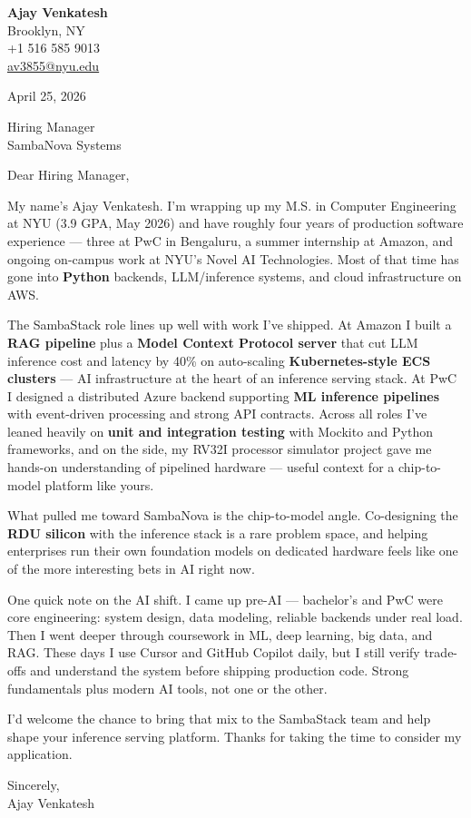 \documentclass[letterpaper,11pt]{article}
\begin{document}
\begin{flushleft}
\textbf{\large Ajay Venkatesh} \\
Brooklyn, NY \\
+1 516 585 9013 \\
\href{mailto:av3855@nyu.edu}{av3855@nyu.edu}
\end{flushleft}

\vspace{10pt}

April 25, 2026

\vspace{6pt}

Hiring Manager \\
SambaNova Systems

\vspace{10pt}

Dear Hiring Manager,

My name's Ajay Venkatesh. I'm wrapping up my M.S. in Computer Engineering at NYU (3.9 GPA, May 2026) and have roughly four years of production software experience --- three at PwC in Bengaluru, a summer internship at Amazon, and ongoing on-campus work at NYU's Novel AI Technologies. Most of that time has gone into \textbf{Python} backends, LLM/inference systems, and cloud infrastructure on AWS.

The SambaStack role lines up well with work I've shipped. At Amazon I built a \textbf{RAG pipeline} plus a \textbf{Model Context Protocol server} that cut LLM inference cost and latency by 40\% on auto-scaling \textbf{Kubernetes-style ECS clusters} --- AI infrastructure at the heart of an inference serving stack. At PwC I designed a distributed Azure backend supporting \textbf{ML inference pipelines} with event-driven processing and strong API contracts. Across all roles I've leaned heavily on \textbf{unit and integration testing} with Mockito and Python frameworks, and on the side, my RV32I processor simulator project gave me hands-on understanding of pipelined hardware --- useful context for a chip-to-model platform like yours.

What pulled me toward SambaNova is the chip-to-model angle. Co-designing the \textbf{RDU silicon} with the inference stack is a rare problem space, and helping enterprises run their own foundation models on dedicated hardware feels like one of the more interesting bets in AI right now.

One quick note on the AI shift. I came up pre-AI --- bachelor's and PwC were core engineering: system design, data modeling, reliable backends under real load. Then I went deeper through coursework in ML, deep learning, big data, and RAG. These days I use Cursor and GitHub Copilot daily, but I still verify trade-offs and understand the system before shipping production code. Strong fundamentals plus modern AI tools, not one or the other.

I'd welcome the chance to bring that mix to the SambaStack team and help shape your inference serving platform. Thanks for taking the time to consider my application.

\vspace{12pt}

Sincerely, \\
Ajay Venkatesh
\end{document}
